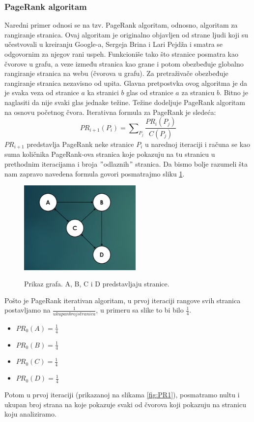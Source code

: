 \documentclass[a4paper]{article}
\begin{document}
\subsubsection{PageRank algoritam}
Naredni primer odnosi se na tzv. PageRank algoritam, odnosno, algoritam za rangiranje stranica. Ovaj algoritam je originalno objavljen od strane ljudi koji su učestvovali u kreiranju Google-a, Sergeja Brina i Lari Pejdža i smatra se odgovornim za njegov rani uspeh. Funkcioniše tako što stranice posmatra kao čvorove u grafu, a veze između stranica kao grane i potom obezbeđuje globalno rangiranje stranica na webu (čvorova u grafu). Za pretraživače obezbeđuje rangiranje stranica nezavisno od upita. Glavna pretpostvka ovog algoritma je da je svaka veza od stranice $a$ ka stranici $b$ glas od stranice $a$ za stranicu $b$. Bitno je naglasiti da nije svaki glas jednake težine. Težine dodeljuje PageRank algoritam na osnovu početnog čvora. Iterativna formula za PageRank je sledeća:
\begin{equation}
PR_{i+1}(P_i) = \sum\nolimits_{P_j}\frac{PR_i(P_j)}{C(P_j)}
\end{equation}
$PR_{i+1}$ predstavlja PageRank neke stranice $P_i$ u narednoj iteraciji i računa se kao suma količnika PageRank-ova stranica koje pokazuju na tu stranicu u prethodnim iteracijama i broja $"$odlaznih$"$ stranica. Da bismo bolje razumeli šta nam zapravo navedena formula govori posmatrajmo sliku \ref{fig:pr1}. 
\begin{figure}[t]
\includegraphics[width=6cm]{Pictures/pr1.png}
\centering
\label{fig:pr1}
\caption{Prikaz grafa. A, B, C i D predstavljaju stranice.}
\end{figure}


Pošto je PageRank iterativan algoritam, u prvoj iteraciji rangove svih stranica postavljamo na $\frac{1}{ukupanbrojstranica}$, u primeru sa slike to bi bilo $\frac{1}{4}$. 
\begin{itemize}
\item $PR_0(A) = \frac{1}{4}$
\item $PR_0(B) = \frac{1}{4}$
\item $PR_0(C) = \frac{1}{4}$
\item $PR_0(D) = \frac{1}{4}$
\end{itemize}
Potom u prvoj iteraciji (prikazanoj na slikama \ref{fig:PR1}), posmatramo nultu i ukupan broj strana na koje pokazuje svaki od čvorova koji pokazuju na stranicu koju analiziramo.
\end{document}

